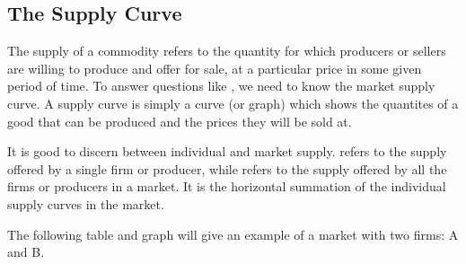 \documentclass[letterpaper,10pt,english]{jupyterBook}
\begin{document}
\subsection{The Supply Curve}
\label{\detokenize{content/02-supply/01-supply:the-supply-curve}}\label{\detokenize{content/02-supply/01-supply::doc}}
\sphinxAtStartPar
The supply of a commodity refers to the quantity for which producers or sellers are willing to produce and offer for sale, at a particular price in some given period of time. To answer questions like , we need to know the market supply curve. A supply curve is simply a curve (or graph) which shows the quantites of a good that can be produced and the prices they will be sold at.

\sphinxAtStartPar
It is good to discern between individual and market supply.  refers to the supply offered by a single firm or producer, while  refers to the supply offered by all the firms or producers in a market. It is the horizontal summation of the individual supply curves in the market.

\sphinxAtStartPar
The following table and graph will give an example of a market with two firms: A and B.

\begin{sphinxVerbatim}[commandchars=\\\{\}]
  
       
       
       
       
\end{sphinxVerbatim}
\end{document}
